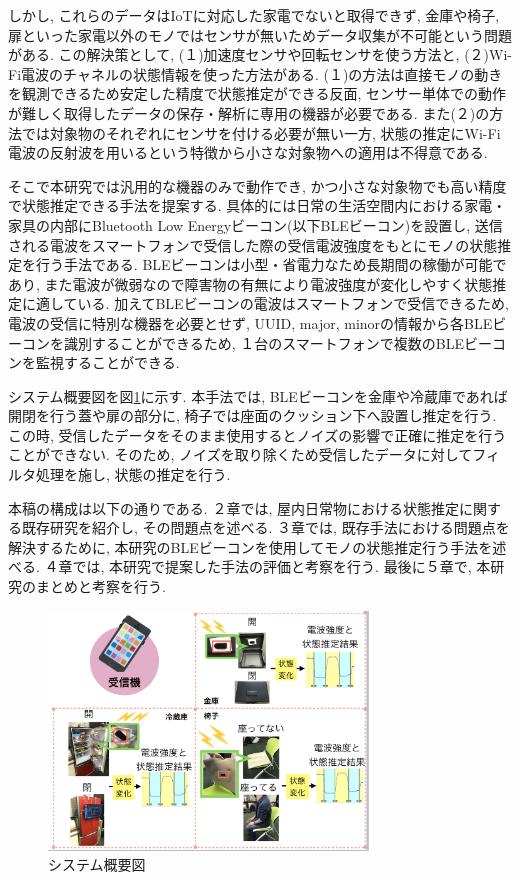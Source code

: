 \documentclass[Japanese]{dicomopapers}
\begin{document}
しかし, これらのデータはIoTに対応した家電でないと取得できず, 金庫や椅子, 扉といった家電以外のモノではセンサが無いためデータ収集が不可能という問題がある.
この解決策として, (１)加速度センサや回転センサを使う方法と, (２)Wi-Fi電波のチャネルの状態情報を使った方法がある.
(１)の方法は直接モノの動きを観測できるため安定した精度で状態推定ができる反面, センサー単体での動作が難しく取得したデータの保存・解析に専用の機器が必要である. %
また(２)の方法では対象物のそれぞれにセンサを付ける必要が無い一方, 状態の推定にWi-Fi電波の反射波を用いるという特徴から小さな対象物への適用は不得意である.

そこで本研究では汎用的な機器のみで動作でき, かつ小さな対象物でも高い精度で状態推定できる手法を提案する.
具体的には日常の生活空間内における家電・家具の内部にBluetooth Low Energyビーコン(以下BLEビーコン)を設置し, 送信される電波をスマートフォンで受信した際の受信電波強度をもとにモノの状態推定を行う手法である.
BLEビーコンは小型・省電力なため長期間の稼働が可能であり, また電波が微弱なので障害物の有無により電波強度が変化しやすく状態推定に適している.
加えてBLEビーコンの電波はスマートフォンで受信できるため, 電波の受信に特別な機器を必要とせず, UUID, major, minorの情報から各BLEビーコンを識別することができるため, １台のスマートフォンで複数のBLEビーコンを監視することができる.

システム概要図を図\ref{abst}に示す.
本手法では, BLEビーコンを金庫や冷蔵庫であれば開閉を行う蓋や扉の部分に, 椅子では座面のクッション下へ設置し推定を行う.
この時, 受信したデータをそのまま使用するとノイズの影響で正確に推定を行うことができない.
そのため, ノイズを取り除くため受信したデータに対してフィルタ処理を施し, 状態の推定を行う.

本稿の構成は以下の通りである.
２章では, 屋内日常物における状態推定に関する既存研究を紹介し, その問題点を述べる.
３章では, 既存手法における問題点を解決するために, 本研究のBLEビーコンを使用してモノの状態推定行う手法を述べる.
４章では, 本研究で提案した手法の評価と考察を行う.
最後に５章で, 本研究のまとめと考察を行う.



\begin{figure}[ht]
 \centering
 \includegraphics[width=8.5cm]{abst.png}
 \caption{システム概要図}
 \label{abst}
\end{figure}
\end{document}
